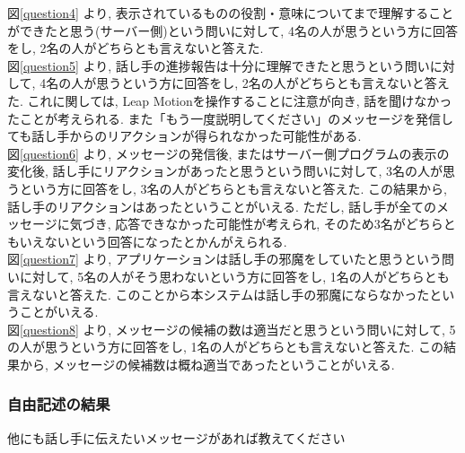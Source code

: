 \documentclass{funthesis}
\begin{document}
図\ref{question4} より, 表示されているものの役割・意味についてまで理解することができたと思う(サーバー側)という問いに対して, 4名の人が思うという方に回答をし, 2名の人がどちらとも言えないと答えた. \\

図\ref{question5} より, 話し手の進捗報告は十分に理解できたと思うという問いに対して, 4名の人が思うという方に回答をし, 2名の人がどちらとも言えないと答えた. これに関しては, Leap Motionを操作することに注意が向き, 話を聞けなかったことが考えられる. また「もう一度説明してください」のメッセージを発信しても話し手からのリアクションが得られなかった可能性がある. \\

図\ref{question6} より, メッセージの発信後, またはサーバー側プログラムの表示の変化後, 話し手にリアクションがあったと思うという問いに対して, 3名の人が思うという方に回答をし, 3名の人がどちらとも言えないと答えた. この結果から, 話し手のリアクションはあったということがいえる. ただし, 話し手が全てのメッセージに気づき, 応答できなかった可能性が考えられ, そのため3名がどちらともいえないという回答になったとかんがえられる. \\

図\ref{question7} より, アプリケーションは話し手の邪魔をしていたと思うという問いに対して, 5名の人がそう思わないという方に回答をし, 1名の人がどちらとも言えないと答えた. このことから本システムは話し手の邪魔にならなかったということがいえる. \\

図\ref{question8} より, メッセージの候補の数は適当だと思うという問いに対して, 5の人が思うという方に回答をし, 1名の人がどちらとも言えないと答えた. この結果から, メッセージの候補数は概ね適当であったということがいえる. \\

\subsubsection{自由記述の結果}
他にも話し手に伝えたいメッセージがあれば教えてください\\
\end{document}
